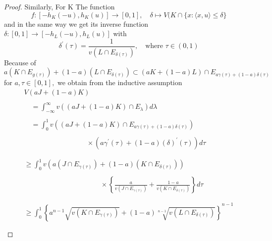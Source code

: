 \documentclass[oneside]{book}
\begin{document}
\begin{proof}
Similarly, For K
The function
\[
f:\left[-h_{K}(-u), h_{K}(u)\right] \rightarrow[0,1], \quad \delta \mapsto V(K \cap\{x:\langle x, u\rangle \leq  \delta \}
\]
and in the same way
we get its inverse function $ \delta:[0,1] \rightarrow\left[-h_{L}(-u), h_{L}(u)\right]$     with 
\[
\delta^{\prime}(\tau)=\frac{1}{v\left(L \cap E_{\delta(\tau)}\right)}, \quad  \text{where } \tau \in(0,1)
\]
Because of
\[
a\left(K \cap E_{g(\tau)}\right)+(1-a)\left(L \cap E_{\delta(\tau)}\right) \subset(a K+(1-a) L) \cap E_{a \gamma(\tau)+(1-a) \delta(\tau)}
\]
for $a, \tau \in[0,1],$ we obtain from the inductive assumption
\[
\begin{array}{l}
V(a J+(1-a) K) \\\\

\quad=\int_{-\infty}^{\infty} v\left((a J+(1-a) K) \cap E_{\lambda}\right) d \lambda \\\\



\quad=\int_{0}^{1} v\left((a J+(1-a) K) \cap E_{a \gamma(\tau)+(1-a) \delta(\tau)}\right) \\\\


 \quad  \quad \quad \quad \quad \quad \quad \quad \quad \times
\left(a \gamma^{\prime}(\tau)+(1-a) (\delta)^{\prime}(\tau)\right) d \tau












\\\\\\

\geq \int_{0}^{1} v\left(a\left(J \cap E_{\gamma(\tau)}\right)+(1-a)\left(K \cap E_{\delta(\tau)}\right)\right)
\\\\

 \quad \quad \quad \quad \quad \quad \quad \quad \quad \quad \quad
 
 \times
 
 \left\{\frac{a}{v\left(J \cap E_{\gamma(\tau)}\right)}+\frac{1-a}{v\left(K \cap E_{\delta(\tau)}\right)}\right\} d \tau \\\\\\

\geq \int_{0}^{1} \left\{  a^{n-1} \sqrt{v\left(K \cap E_{\gamma(\tau)}\right)}+(1-a) \sqrt[n-1]{v\left(L \cap E_{\delta(\tau)}\right)} \right\}^{n-1} \\\\


\end{array}\]
\end{proof}
\end{document}
